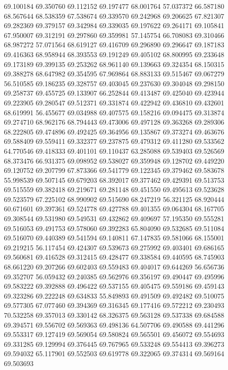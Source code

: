 69.100184
69.350760
69.112152
69.197477
68.001764
57.037372
66.587180
68.567644
68.538359
67.538674
69.339570
69.242968
69.206625
67.821307
69.282369
69.379157
69.342984
69.339035
69.197622
69.264171
69.105841
67.950007
69.312191
69.297860
69.359981
57.145754
66.708083
69.310466
68.987272
57.071564
68.619127
69.416709
69.296890
69.296647
69.187183
69.416363
68.958944
68.393553
69.191249
69.405102
68.800995
69.233648
69.173189
69.399135
69.253262
68.961140
69.139663
69.324354
68.150315
69.388278
68.647982
69.354595
67.969864
68.883133
69.515467
69.067279
56.510585
69.186235
69.328757
69.403045
69.237630
69.304048
69.298150
69.258737
69.455725
69.133907
66.252844
69.413487
69.425040
69.423944
69.223905
69.280547
69.512371
69.331874
69.422942
69.436810
69.432601
68.619991
56.455677
69.034988
69.407575
69.158216
69.094475
69.313874
69.274710
68.962176
68.794443
69.473006
69.497128
69.363268
69.289306
68.222805
69.474896
69.492425
69.364956
69.135867
69.373274
69.463676
69.588409
69.559411
69.332377
69.237875
69.479312
69.411280
69.533562
64.770546
69.418333
69.401101
69.110437
63.285088
69.539403
69.526569
68.373476
66.931375
69.098952
69.538027
69.359948
69.128702
69.449220
69.120752
69.207799
67.873366
69.541779
69.122345
69.379462
69.583678
55.998539
69.507145
69.679203
68.392017
69.377462
69.429391
69.513753
69.515559
69.382418
69.219671
69.281148
69.451550
69.495613
69.523628
69.523579
67.225102
68.990902
69.515690
68.247219
56.321125
68.920444
60.671601
69.397361
69.524778
69.427788
69.401355
69.064304
68.167705
69.308544
69.531980
69.549531
69.432862
69.409697
57.195350
69.555281
69.516053
69.491753
69.578060
69.392283
65.804090
69.532685
69.511084
69.516070
69.440389
69.541594
69.140811
67.147835
69.581066
68.155001
69.219215
56.117454
69.424307
69.539673
69.275992
69.403401
69.686165
69.560681
69.416528
69.312415
69.428477
69.338584
69.440595
68.745903
68.661220
69.207266
69.602403
69.559483
69.404017
69.644269
56.656736
69.352707
56.059432
69.240385
69.562976
69.356197
69.490447
69.495996
69.583222
69.392888
69.496422
69.537155
69.405475
69.559186
69.459143
69.323286
69.222248
69.634833
55.849893
69.491509
69.492482
69.510075
69.577305
67.077460
69.394369
69.316345
69.177416
69.572212
69.230493
70.532258
69.357013
69.330142
68.326375
69.563128
69.537338
69.684588
69.394571
69.556702
69.569363
69.498136
64.507706
69.490588
69.441296
69.553317
69.127419
69.569054
69.580824
69.565501
69.456072
69.554693
69.331285
69.129994
69.376445
69.767965
69.533248
69.554413
69.396273
69.594032
65.117901
69.552503
69.619778
69.322065
69.374314
69.569164
69.503693
